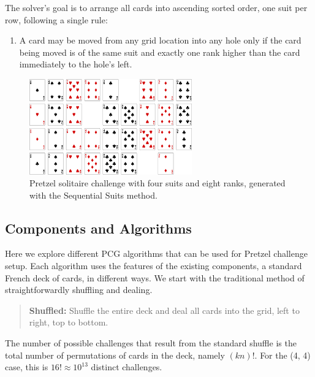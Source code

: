 \documentclass[journal]{IEEEtran}
\begin{document}
The solver's goal is to arrange all cards into ascending sorted order, one suit per row, following a single rule:

\begin{enumerate}
    \item A card may be moved from any grid location into any hole only if the card being moved is of the same suit and exactly one rank higher than the card immediately to the hole's left.
\end{enumerate}


\begin{figure}[t]
\centering
\includegraphics[width=7cm]{figure8.png}
\caption{Pretzel solitaire challenge with four suits and eight ranks, generated with the Sequential Suits method.}
\label{fig:pretzelsequential}
\end{figure}



\subsection{Components and Algorithms}
\noindent
Here we explore different PCG algorithms that can be used for Pretzel challenge setup. Each algorithm uses the features of the existing components, a standard French deck of cards, in different ways. We start with the traditional method of straightforwardly shuffling and dealing.

\begin{quote}
    {\bf Shuffled:} Shuffle the entire deck and deal all cards into the grid, left to right, top to bottom.
\end{quote}

The number of possible challenges that result from the standard shuffle is the total number of permutations of cards in the deck, namely $(kn)!$. For the (4, 4) case, this is $16! \approx 10^{13}$ distinct challenges.
\end{document}
